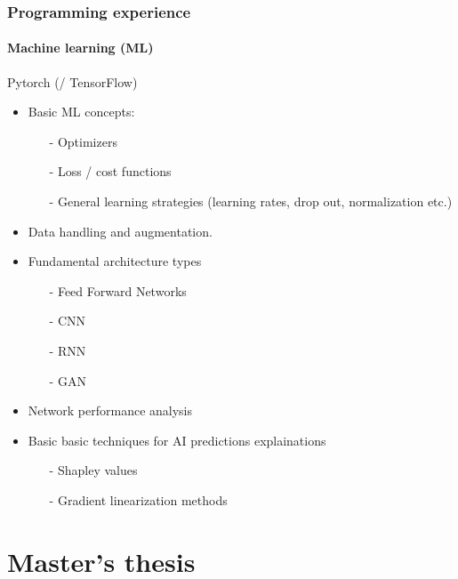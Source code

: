 \documentclass[
	10pt, %
]{beamer}
\begin{document}
\begin{frame}
	\frametitle{Programming experience}
	\framesubtitle{Machine learning (ML)}

	{\large Pytorch (/ TensorFlow)} 
	\begin{itemize}
		\item Basic ML concepts: 
		\begin{itemize}
			\item [-] Optimizers
			\item [-] Loss / cost functions
			\item [-] General learning strategies (learning rates, drop out, normalization etc.)
		\end{itemize}
		
		\item Data handling and augmentation.
		\item Fundamental architecture types 
		\begin{itemize}
			\item [-] Feed Forward Networks
			\item [-] CNN
			\item [-] RNN 
			\item [-] GAN
		\end{itemize}
		\item Network performance analysis
		\item Basic basic techniques for AI predictions explainations
		\begin{itemize}
			\item [-] Shapley values 
			\item [-] Gradient linearization methods
		\end{itemize}
	
	\end{itemize}


\end{frame}





\section{Master's thesis}
\end{document}
